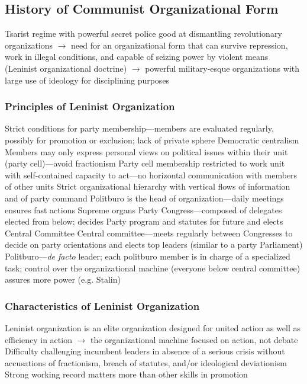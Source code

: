 \documentclass[11pt]{article}
\theoremstyle{definition}
\theoremstyle{remark}
\begin{document}
\subsection{History of Communist Organizational Form}
Tsarist regime with powerful secret police good at dismantling revolutionary organizations $\to$ need for an organizational form that can survive repression, work in illegal conditions, and capable of seizing power by violent means (Leninist organizational doctrine) $\to$ powerful military-esque organizations with large use of ideology for disciplining purposes

\subsubsection{Principles of Leninist Organization}
\begin{outline}[enumerate]
\1 Strict conditions for party membership---members are evaluated regularly, possibly for promotion or exclusion; lack of private sphere
\1 Democratic centralism
	\2 Members may only express personal views on political issues within their unit (party cell)---avoid fractionism
	\2 Party cell membership restricted to work unit with self-contained capacity to act---no horizontal communication with members of other units
	\2 Strict organizational hierarchy with vertical flows of information and of party command
		\3 Politburo is the head of organization---daily meetings ensures fast actions
\1 Supreme organs
	\2 Party Congress---composed of delegates elected from below; decides Party program and statutes for future and elects Central Committee
	\2 Central committee---meets regularly between Congresses to decide on party orientations and elects top leaders (similar to a party Parliament)
	\2 Politburo---\textit{de facto} leader; each politburo member is in charge of a specialized task; control over the organizational machine (everyone below central committee) assures more power (e.g. Stalin)
\end{outline}

\subsubsection{Characteristics of Leninist Organization}
\begin{outline}[enumerate]
\1 Leninist organization is an elite organization designed for united action as well as efficiency in action $\to$ the organizational machine focused on action, not debate
\1 Difficulty challenging incumbent leaders in absence of a serious crisis without accusations of fractionism, breach of statutes, and/or ideological deviationism
\1 Strong working record matters more than other skills in promotion
\end{outline}
\end{document}
